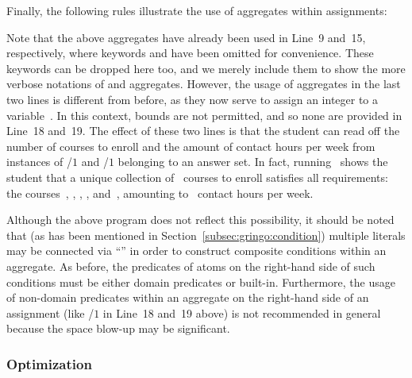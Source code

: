 \begin{example}
Finally, the following rules illustrate the use of aggregates within assignments:
%

%
Note that the above aggregates have already been used in Line~9 and~15, respectively,
where keywords  and  have been omitted for convenience.
These keywords can be dropped here too, and we merely include them to show the
more verbose notations of  and  aggregates.
However, the usage of aggregates in the last two lines is different from before,
as they now serve to assign an integer to a variable~.
In this context, bounds are not permitted, and so none are provided in Line~18 and~19.
The effect of these two lines is that the student can read off the number of
courses to enroll and the amount of contact hours per week from instances of
/$1$ and /$1$ belonging to an answer set.%
%
In fact, running \clasp\ shows the student that a unique
collection of~ courses to enroll satisfies all requirements:
the courses~, , , , and~,
amounting to~ contact hours per week.

Although the above program does not reflect this possibility,
it should be noted that (as has been mentioned in Section~\ref{subsec:gringo:condition})
multiple literals may be connected via ``\code{:}'' in order to construct
composite conditions within an aggregate.
As before, the predicates of atoms on the right-hand side of such conditions
must be either domain predicates or built-in.
Furthermore, the usage of non-domain predicates within an aggregate
on the right-hand side of an assignment (like /$1$ in Line~18 and~19 above)
is not recommended in general because the space blow-up may be significant.
\eexample
\end{example}


\subsubsection{Optimization}\label{subsec:gringo:optimize}

